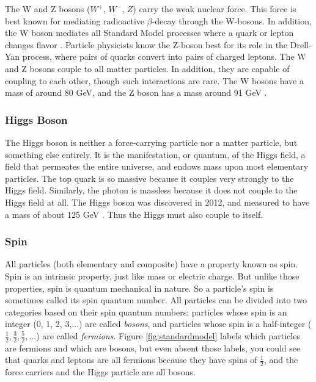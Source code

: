 The W and Z bosons ($W^+$, $W^-$, $Z$) carry the weak nuclear force. This
force is best known for mediating radioactive $\beta$-decay through
the W-bosons. In addition, the W boson mediates all Standard Model
processes where a quark or lepton changes flavor \cite{griffiths}.
Particle physicists know the Z-boson best for its
role in the Drell-Yan process, where pairs of quarks convert into
pairs of charged leptons. The W and Z bosons couple to all matter
particles. In addition, they are capable of coupling to each other,
though such interactions are rare. The W bosons have a mass of around
80 GeV, and the Z boson has a mass around 91 GeV \cite{pdg}.

\subsubsection*{Higgs Boson}
The Higgs boson is neither a force-carrying particle nor a matter particle, but
something else entirely. It is the manifestation, or quantum, of the
Higgs field, a field that permeates the entire universe, and endows
mass upon most elementary particles. The top quark is so massive
because it couples very strongly to the Higgs field. Similarly, the
photon is massless because it does not couple to the Higgs field at all.
The Higgs boson was discovered in 2012, and measured to have a mass
of about 125 GeV \cite{jointhiggs}. Thus the Higgs must also couple to itself.

\subsubsection*{Spin}
All particles (both elementary and composite) have
a property known as spin. Spin is an intrinsic property, just like
mass or electric charge. But unlike those properties, spin is quantum
mechanical in nature. So a particle's spin is sometimes called its
spin quantum number. All particles can be divided into two categories
based on their spin quantum numbers: particles whose spin is an
integer (0, 1, 2, 3,$\ldots$) are called \emph{bosons}, and particles whose
spin is a half-integer ($\frac{1}{2}, \frac{3}{2}, \frac{5}{2},\ldots$)
are called \emph{fermions}. Figure \ref{fig:standardmodel}
labels which particles are fermions and which are bosons, but even
absent those labels, you could see that quarks and leptons are all
fermions because they have spins of $\frac{1}{2}$, and the force
carriers and the Higgs particle are all bosons.

